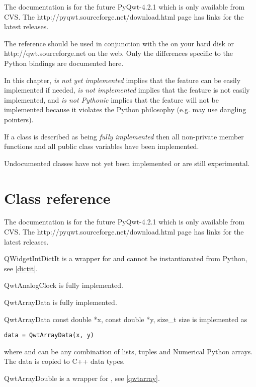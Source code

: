 \documentclass{manual}
\newcommand{\Qwt}{\ulink{Qwt}
  {http://qwt.sourceforge.net}}
\newcommand{\Download}{\ulink{download}
  {http://pyqwt.sourceforge.net/download.html}}
\newcommand{\Future}{
  \begin{notice}[warning]
    The documentation is for the future PyQwt-4.2.1 which is only available
    from CVS. The \Download{} page has links for the latest releases.
  \end{notice}
}
\begin{document}
\Future{}

The reference should be used in conjunction with the
 on your hard disk or \Qwt{} on the web.
Only the differences specific to the Python bindings are documented here.

In this chapter, \emph{is not yet implemented} implies that the feature can
be easily implemented if needed, \emph{is not implemented} implies that the
feature is not easily implemented, and \emph{is not Pythonic} implies that
the feature will not be implemented because it violates the Python philosophy
(e.g. may use dangling pointers).

If a class is described as being \emph{fully implemented} then all non-private
member functions and all public class variables have been implemented.

Undocumented classes have not yet been implemented or are still experimental.


\section{Class reference \label{classes}}

\Future{}


\begin{classdesc*}{QWidgetIntDictIt}
  is a wrapper for  and cannot be instantianated from
  Python, see \ref{dictit}.
\end{classdesc*}

\begin{classdesc*}{QwtAnalogClock}
  is fully implemented.
\end{classdesc*}

\begin{classdesc*}{QwtArrayData}
  is fully implemented.

  \begin{cfuncdesc}{}{QwtArrayData}{
      const double *x, const double *y, size_t size}
    is implemented as
    \begin{verbatim}
data = QwtArrayData(x, y)
    \end{verbatim}
    where  and  can be any combination of lists, tuples and
    Numerical Python arrays.  The data is copied to C++ data types.
  \end{cfuncdesc}
\end{classdesc*}

\begin{classdesc*}{QwtArrayDouble}
  is a wrapper for , see \ref{qwtarray}.
\end{classdesc*}
\end{document}
